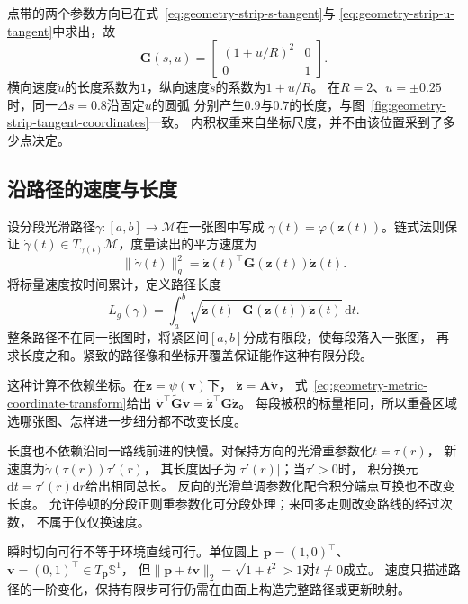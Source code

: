 点带的两个参数方向已在式~\eqref{eq:geometry-strip-s-tangent}与
\eqref{eq:geometry-strip-u-tangent}中求出，故
\begin{equation}
 \bm G(s,u)=
 \begin{bmatrix}(1+u/R)^2&0\\0&1\end{bmatrix}.
 \label{eq:geometry-strip-metric}
\end{equation}
横向速度$\dot u$的长度系数为$1$，纵向速度$\dot s$的系数为$1+u/R$。
在$R=2$、$u=\pm0.25$时，同一$\Delta s=0.8$沿固定$u$的圆弧
分别产生$0.9$与$0.7$的长度，与图~\ref{fig:geometry-strip-tangent-coordinates}一致。
内积权重来自坐标尺度，并不由该位置采到了多少点决定。

\subsection{沿路径的速度与长度}
\label{sec:geometry-path-speed-length}

设分段光滑路径$\gamma:[a,b]\to\mathcal M$在一张图中写成
$\gamma(t)=\varphi(\bm z(t))$。链式法则保证
$\dot\gamma(t)\in T_{\gamma(t)}\mathcal M$，度量读出的平方速度为
\begin{equation}
 \lVert\dot\gamma(t)\rVert_g^2
 =\dot{\bm z}(t)^\top\bm G(\bm z(t))\dot{\bm z}(t).
 \label{eq:geometry-riemannian-speed}
\end{equation}
将标量速度按时间累计，定义路径长度
\begin{equation}
 L_g(\gamma)=\int_a^b
 \sqrt{\dot{\bm z}(t)^\top\bm G(\bm z(t))\dot{\bm z}(t)}\,\mathrm dt.
 \label{eq:geometry-riemannian-curve-length}
\end{equation}
整条路径不在同一张图时，将紧区间$[a,b]$分成有限段，使每段落入一张图，
再求长度之和。紧致的路径像和坐标开覆盖保证能作这种有限分段。

这种计算不依赖坐标。在$\bm z=\psi(\bm v)$下，
$\dot{\bm z}=\bm A\dot{\bm v}$，
式~\eqref{eq:geometry-metric-coordinate-transform}给出
$\dot{\bm v}^\top\widetilde{\bm G}\dot{\bm v}
=\dot{\bm z}^\top\bm G\dot{\bm z}$。
每段被积的标量相同，所以重叠区域选哪张图、怎样进一步细分都不改变长度。

长度也不依赖沿同一路线前进的快慢。对保持方向的光滑重参数化$t=\tau(r)$，
新速度为$\dot\gamma(\tau(r))\tau'(r)$，
其长度因子为$|\tau'(r)|$；当$\tau'>0$时，
积分换元$\mathrm dt=\tau'(r)\mathrm dr$给出相同总长。
反向的光滑单调参数化配合积分端点互换也不改变长度。
允许停顿的分段正则重参数化可分段处理；来回多走则改变路线的经过次数，
不属于仅仅换速度。

瞬时切向可行不等于环境直线可行。单位圆上
$\bm p=(1,0)^\top$、$\bm v=(0,1)^\top\in T_{\bm p}\mathbb S^1$，
但$\lVert\bm p+t\bm v\rVert_2=\sqrt{1+t^2}>1$对$t\neq0$成立。
速度只描述路径的一阶变化，保持有限步可行仍需在曲面上构造完整路径或更新映射。

